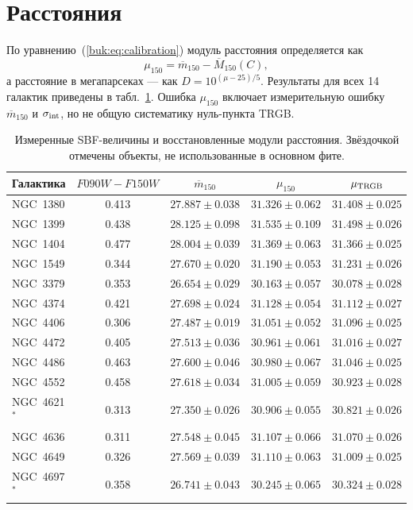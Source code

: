 \section{Расстояния}

По уравнению~(\ref{buk:eq:calibration}) модуль расстояния определяется как
\begin{equation}
    \mu_{150}=\overline m_{150}-\overline M_{150}(C),
\end{equation}
а расстояние в мегапарсеках --- как $D=10^{(\mu-25)/5}$. Результаты для всех 14 галактик приведены в табл.~\ref{buk:tab:distances}. Ошибка $\mu_{150}$ включает измерительную ошибку $\overline m_{150}$ и $\sigma_{\rm int}$, но не общую систематику нуль-пункта TRGB.

\begin{table}[H]
\centering
\caption{Измеренные SBF-величины и восстановленные модули расстояния. Звёздочкой отмечены объекты, не использованные в основном фите.}
\label{buk:tab:distances}
\scriptsize
\setlength{\tabcolsep}{3.2pt}
\begin{tabular}{lcccc}
\hline
Галактика & $F090W-F150W$ & $\overline m_{150}$ & $\mu_{150}$ & $\mu_{\rm TRGB}$\\
\hline
NGC~1380 & 0.413 & $27.887\pm0.038$ & $31.326\pm0.062$ & $31.408\pm0.025$\\
NGC~1399 & 0.438 & $28.125\pm0.098$ & $31.535\pm0.109$ & $31.498\pm0.026$\\
NGC~1404 & 0.477 & $28.004\pm0.039$ & $31.369\pm0.063$ & $31.366\pm0.025$\\
NGC~1549 & 0.344 & $27.670\pm0.020$ & $31.190\pm0.053$ & $31.231\pm0.026$\\
NGC~3379 & 0.353 & $26.654\pm0.029$ & $30.163\pm0.057$ & $30.078\pm0.028$\\
NGC~4374 & 0.421 & $27.698\pm0.024$ & $31.128\pm0.054$ & $31.112\pm0.027$\\
NGC~4406 & 0.306 & $27.487\pm0.019$ & $31.051\pm0.052$ & $31.096\pm0.025$\\
NGC~4472 & 0.405 & $27.513\pm0.036$ & $30.961\pm0.061$ & $31.016\pm0.027$\\
NGC~4486 & 0.463 & $27.600\pm0.046$ & $30.980\pm0.067$ & $31.046\pm0.025$\\
NGC~4552 & 0.458 & $27.618\pm0.034$ & $31.005\pm0.059$ & $30.923\pm0.028$\\
NGC~4621$^{*}$ & 0.313 & $27.350\pm0.026$ & $30.906\pm0.055$ & $30.821\pm0.026$\\
NGC~4636 & 0.311 & $27.548\pm0.045$ & $31.107\pm0.066$ & $31.070\pm0.026$\\
NGC~4649 & 0.326 & $27.569\pm0.039$ & $31.110\pm0.063$ & $31.009\pm0.025$\\
NGC~4697$^{*}$ & 0.358 & $26.741\pm0.043$ & $30.245\pm0.065$ & $30.324\pm0.028$\\
\hline
\end{tabular}
\end{table}

